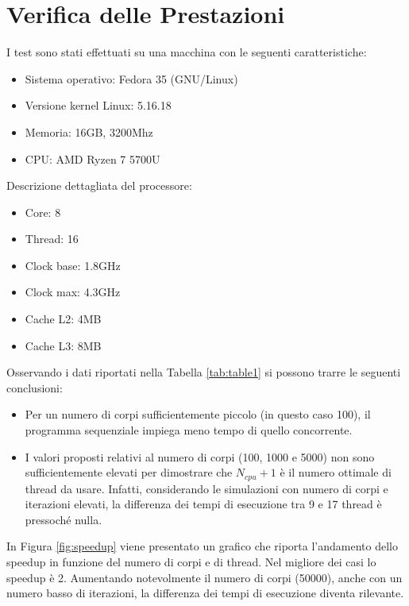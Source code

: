 \documentclass[12pt,a4paper,openright,twoside]{book}
\begin{document}
\chapter{Verifica delle Prestazioni} %
\label{chap:Verifica delle Prestazioni}

I test sono stati effettuati su una macchina con le seguenti caratteristiche:
\begin{itemize}
	\item Sistema operativo: Fedora 35 (GNU/Linux)
	\item Versione kernel Linux: 5.16.18
	\item Memoria: 16GB, 3200Mhz
	\item CPU: AMD Ryzen 7 5700U
\end{itemize}
Descrizione dettagliata del processore:
\begin{itemize}
	\item Core: 8
	\item Thread: 16
	\item Clock base: 1.8GHz
	\item Clock max: 4.3GHz
	\item Cache L2: 4MB
	\item Cache L3: 8MB
\end{itemize}

Osservando i dati riportati nella Tabella \ref{tab:table1}
si possono trarre le seguenti conclusioni:
\begin{itemize}
	\item Per un numero di corpi sufficientemente piccolo (in questo caso 100),
	il programma sequenziale impiega meno tempo di quello concorrente.
	\item I valori proposti relativi al numero di corpi (100, 1000 e 5000) non sono sufficientemente elevati per
	dimostrare che $N_{cpu}+1$ è il numero ottimale di thread da usare. Infatti, considerando
	le simulazioni con numero di corpi e iterazioni elevati, la differenza dei tempi di esecuzione tra 9 e 17 thread è pressoché nulla.
\end{itemize}

In Figura \ref{fig:speedup} viene presentato un grafico che riporta l'andamento dello speedup in funzione del numero di corpi e di thread.
Nel migliore dei casi lo speedup è 2.
Aumentando notevolmente il numero di corpi (50000), anche con un numero basso di iterazioni,
la differenza dei tempi di esecuzione diventa rilevante.
\end{document}

